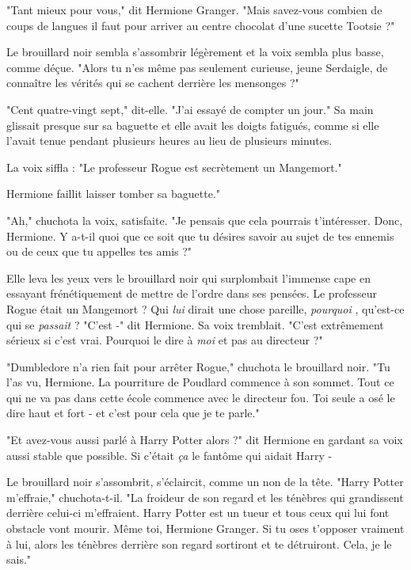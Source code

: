 "Tant mieux pour vous," dit Hermione Granger. "Mais savez-vous combien de coups de langues il faut pour arriver au centre chocolat d'une sucette Tootsie ?"

Le brouillard noir sembla s'assombrir légèrement et la voix sembla plus basse, comme déçue. "Alors tu n'es même pas seulement curieuse, jeune Serdaigle, de connaître les vérités qui se cachent derrière les mensonges ?"

"Cent quatre-vingt sept," dit-elle. "J'ai essayé de compter un jour." Sa main glissait presque sur sa baguette et elle avait les doigts fatigués, comme si elle l'avait tenue pendant plusieurs heures au lieu de plusieurs minutes.

La voix siffla : "Le professeur Rogue est secrètement un Mangemort."

Hermione faillit laisser tomber sa baguette."

"Ah," chuchota la voix, satisfaite. "Je pensais que cela pourrais t'intéresser. Donc, Hermione. Y a-t-il quoi que ce soit que tu désires savoir au sujet de tes ennemis ou de ceux que tu appelles tes amis ?"

Elle leva les yeux vers le brouillard noir qui surplombait l'immense cape en essayant frénétiquement de mettre de l'ordre dans ses pensées. Le professeur Rogue était un Mangemort ? Qui \emph{lui}  dirait une chose pareille, \emph{pourquoi} , qu'est-ce qui se \emph{passait}  ? "C'est -" dit Hermione. Sa voix tremblait. "C'est extrêmement sérieux si c'est vrai. Pourquoi le dire à \emph{moi}  et pas au directeur ?"

"Dumbledore n'a rien fait pour arrêter Rogue," chuchota le brouillard noir. "Tu l'as vu, Hermione. La pourriture de Poudlard commence à son sommet. Tout ce qui ne va pas dans cette école commence avec le directeur fou. Toi seule a osé le dire haut et fort - et c'est pour cela que je te parle."

"Et avez-vous aussi parlé à Harry Potter alors ?" dit Hermione en gardant sa voix aussi stable que possible. Si c'était \emph{ça}  le fantôme qui aidait Harry -

Le brouillard noir s'assombrit, s'éclaircit, comme un non de la tête. "Harry Potter m'effraie," chuchota-t-il. "La froideur de son regard et les ténèbres qui grandissent derrière celui-ci m'effraient. Harry Potter est un tueur et tous ceux qui lui font obstacle vont mourir. Même toi, Hermione Granger. Si tu oses t'opposer vraiment à lui, alors les ténèbres derrière son regard sortiront et te détruiront. Cela, je le sais."

